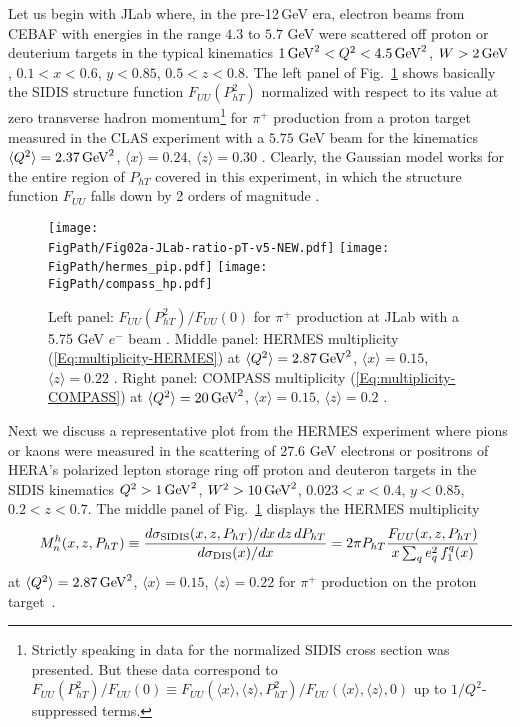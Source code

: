 \documentclass[a4paper,11pt]{article}
\newcommand{\be}{\begin{equation}}
\newcommand{\ee}{\end{equation}}
\newcommand{\la}{\langle}
\newcommand{\ra}{\rangle}
\def\Phperp{P_{hT}}
\newcommand*{\FigPath}{./figs}%
\begin{document}
Let us begin with JLab where, in the pre-12$\,$GeV era, electron beams
from CEBAF with energies in the range $4.3$ to $5.7$ GeV were scattered
off proton or deuterium targets in the typical kinematics
$1 \,{\rm GeV}^2 < Q^2 < 4.5 \,{\rm GeV}^2$, $W > 2\,{\rm GeV}$,
$0.1 < x < 0.6$, $y < 0.85$, $0.5<z<0.8$.
The left panel of Fig.~\ref{FUU-show-pT-dependence} shows basically
the SIDIS structure function $F_{UU}(P_{hT}^2)$ normalized with respect
to its value at zero transverse hadron momentum\footnote{Strictly
	speaking in \cite{Osipenko:2008aa} data for the normalized
	SIDIS cross section was presented. But these data correspond
	to $F_{UU}(P_{hT}^2)/F_{UU}(0) \equiv
	F_{UU}(\la x\ra,\la z\ra,P_{hT}^2)/F_{UU}(\la x\ra,\la z\ra,0)$
	up to $1/Q^2$-suppressed terms.}
for $\pi^+$ production from a proton target measured in the CLAS experiment
with a $5.75$ GeV beam for the kinematics $\la Q^2\ra=2.37\,{\rm GeV}^2$,
$\la x\ra=0.24$, $\la z\ra=0.30$ \cite{Osipenko:2008aa}. Clearly, the
Gaussian model works for the entire region of $P_{hT}$ covered in this
experiment, in which the structure function $F_{UU}$ falls down by 2 orders of
magnitude \cite{Schweitzer:2010tt}.

\begin{figure}[t!]
\centering
\texttt{[image: \\FigPath/Fig02a-JLab-ratio-pT-v5-NEW.pdf]}  \quad
\texttt{[image: \\FigPath/hermes\_pip.pdf]} \quad
\texttt{[image: \\FigPath/compass\_hp.pdf]}
\caption{\label{FUU-show-pT-dependence}
Left panel:
	$F_{UU}(P_{hT}^2)/F_{UU}(0)$ for $\pi^+$
	production
	at JLab with a 5.75 GeV $e^{-}$ beam \cite{Osipenko:2008aa}.
Middle panel:
	HERMES multiplicity (\ref{Eq:multiplicity-HERMES}) at
	$\la Q^2\ra=2.87\,{\rm GeV}^2$, $\la x\ra  =0.15$, $\la z\ra  =0.22$
	 \cite{Airapetian:2012ki}.
Right panel:
	COMPASS multiplicity (\ref{Eq:multiplicity-COMPASS}) at
	$\la Q^2\ra=20\,{\rm GeV}^2$, $\la x\ra  =0.15$, $\la z\ra  =0.2$
	 \cite{Aghasyan:2017ctw}.}
\end{figure}

Next we discuss a representative plot from the HERMES experiment
where pions or kaons were measured in the scattering of 27.6 GeV
electrons or positrons of HERA's polarized lepton storage ring
off proton and deuteron targets in the SIDIS kinematics
$Q^2 > 1 \,{\rm GeV}^2$, $W^{2} > 10\,{\rm GeV}^{2}$,
$0.023 < x < 0.4$, $y < 0.85$, $0.2<z<0.7$.
The middle panel of Fig.~\ref{FUU-show-pT-dependence} displays the
HERMES multiplicity~\cite{Airapetian:2012ki}
\be\label{Eq:multiplicity-HERMES}
	M_n^h(x,z,\Phperp) \equiv
	\frac{d\sigma_{\rm SIDIS}(x,z,\Phperp)/dx\,dz\,d\Phperp}
	{d\sigma_{\rm DIS}(x)/dx} =
	2 \pi \Phperp \frac{F_{UU}(x,z,\Phperp) }{ x \sum_q e_q^2\,f^q_1(x)}
\ee
at $\la Q^2\ra=2.87\,{\rm GeV}^2$, $\la x\ra=0.15$, $\la z\ra=0.22$
for $\pi^+$ production on the proton target~\cite{Airapetian:2012ki}.
\end{document}
